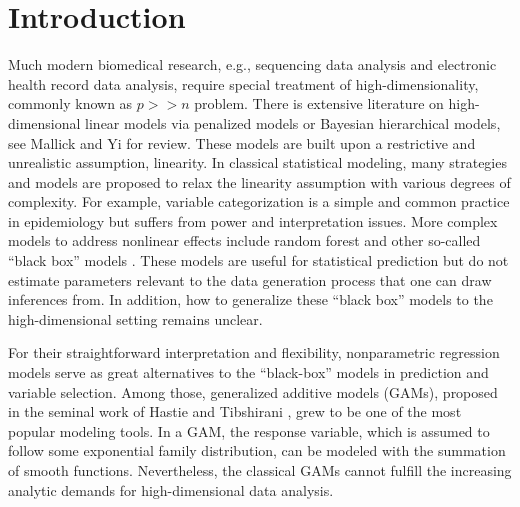 \documentclass[AMA,STIX1COL,]{WileyNJD-v2}
\begin{document}
\pgfplotsset{compat=1.18}
\usetikzlibrary{shapes.geometric, arrows, positioning, calc, matrix, backgrounds, fit}
\newcommand{\bs}[1]{\boldsymbol{#1}}
\newcommand{\tp}{*}
\newcommand{\pr}{\text{Pr}}
\newcommand{\repa}{\text{repa}}
\newcommand{\simiid}{\overset{\text{iid}}{\sim}}

\section{Introduction}
\label{sec:intro}

Much modern biomedical research, e.g., sequencing data analysis and
electronic health record data analysis, require special treatment of
high-dimensionality, commonly known as \(p >> n\) problem. There is
extensive literature on high-dimensional linear models via penalized
models or Bayesian hierarchical models, see Mallick and Yi
\citep{Mallick2013} for review. These models are built upon a
restrictive and unrealistic assumption, linearity. In classical
statistical modeling, many strategies and models are proposed to relax
the linearity assumption with various degrees of complexity. For
example, variable categorization is a simple and common practice in
epidemiology but suffers from power and interpretation issues. More
complex models to address nonlinear effects include random forest and
other so-called ``black box'' models \citep{Breiman2001}. These models
are useful for statistical prediction but do not estimate parameters
relevant to the data generation process that one can draw inferences
from. In addition, how to generalize these ``black box'' models to the
high-dimensional setting remains unclear.

For their straightforward interpretation and flexibility, nonparametric
regression models serve as great alternatives to the ``black-box''
models in prediction and variable selection. Among those, generalized
additive models (GAMs), proposed in the seminal work of Hastie and
Tibshirani \citep{Hastie1987}, grew to be one of the most popular
modeling tools. In a GAM, the response variable, which is assumed to
follow some exponential family distribution, can be modeled with the
summation of smooth functions. Nevertheless, the classical GAMs cannot
fulfill the increasing analytic demands for high-dimensional data
analysis.
\end{document}
